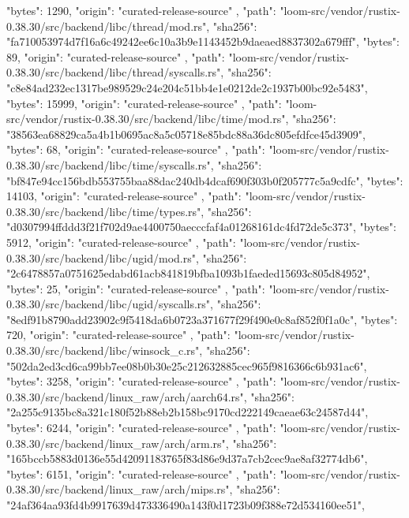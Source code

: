 {{      "bytes": 1290,
      "origin": "curated-release-source"
    },
    {
      "path": "loom-src/vendor/rustix-0.38.30/src/backend/libc/thread/mod.rs",
      "sha256": "fa710053974d7f16a6c49242ee6c10a3b9e1143452b9daeaed8837302a679fff",
      "bytes": 89,
      "origin": "curated-release-source"
    },
    {
      "path": "loom-src/vendor/rustix-0.38.30/src/backend/libc/thread/syscalls.rs",
      "sha256": "c8e84ad232ec1317be989529c24e204c51bb4e1e0212de2c1937b00bc92e5483",
      "bytes": 15999,
      "origin": "curated-release-source"
    },
    {
      "path": "loom-src/vendor/rustix-0.38.30/src/backend/libc/time/mod.rs",
      "sha256": "38563ea68829ca5a4b1b0695ac8a5c05718e85bdc88a36dc805efdfce45d3909",
      "bytes": 68,
      "origin": "curated-release-source"
    },
    {
      "path": "loom-src/vendor/rustix-0.38.30/src/backend/libc/time/syscalls.rs",
      "sha256": "bf847e94cc156bdb553755baa88dac240db4dcaf690f303b0f205777c5a9cdfc",
      "bytes": 14103,
      "origin": "curated-release-source"
    },
    {
      "path": "loom-src/vendor/rustix-0.38.30/src/backend/libc/time/types.rs",
      "sha256": "d0307994ffddd3f21f702d9ae4400750aecccfaf4a01268161dc4fd72de5c373",
      "bytes": 5912,
      "origin": "curated-release-source"
    },
    {
      "path": "loom-src/vendor/rustix-0.38.30/src/backend/libc/ugid/mod.rs",
      "sha256": "2c6478857a0751625edabd61acb841819bfba1093b1faeded15693c805d84952",
      "bytes": 25,
      "origin": "curated-release-source"
    },
    {
      "path": "loom-src/vendor/rustix-0.38.30/src/backend/libc/ugid/syscalls.rs",
      "sha256": "8edf91b8790add23902c9f5418da6b0723a371677f29f490e0c8af852f0f1a0c",
      "bytes": 720,
      "origin": "curated-release-source"
    },
    {
      "path": "loom-src/vendor/rustix-0.38.30/src/backend/libc/winsock_c.rs",
      "sha256": "502da2ed3cd6ca99bb7ee08b0b30e25c212632885cec965f9816366c6b931ac6",
      "bytes": 3258,
      "origin": "curated-release-source"
    },
    {
      "path": "loom-src/vendor/rustix-0.38.30/src/backend/linux_raw/arch/aarch64.rs",
      "sha256": "2a255c9135bc8a321c180f52b88eb2b158bc9170cd222149caeae63c24587d44",
      "bytes": 6244,
      "origin": "curated-release-source"
    },
    {
      "path": "loom-src/vendor/rustix-0.38.30/src/backend/linux_raw/arch/arm.rs",
      "sha256": "165bccb5883d0136e55d42091183765f83d86e9d37a7cb2cec9ae8af32774db6",
      "bytes": 6151,
      "origin": "curated-release-source"
    },
    {
      "path": "loom-src/vendor/rustix-0.38.30/src/backend/linux_raw/arch/mips.rs",
      "sha256": "24af364aa93fd4b9917639d473336490a143f0d1723b09f388e72d534160ee51",
}}
